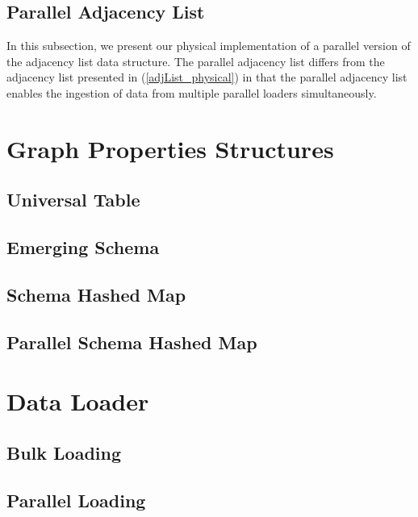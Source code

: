 {\begin{itemize}
\end{itemize}


\subsection{Parallel Adjacency List}

In this subsection, we present our physical implementation of a parallel version of the adjacency list data structure. The parallel adjacency list differs from the adjacency list presented in (\ref{adjList_physical}) in that the parallel adjacency list enables the ingestion of data from multiple parallel loaders simultaneously.



\section{Graph Properties Structures}
\label{GraphPropertiesImp}


\subsection{Universal Table}


\subsection{Emerging Schema}


\subsection{Schema Hashed Map}


\subsection{Parallel Schema Hashed Map}



\section{Data Loader}
\label{dataLoader}
\subsection{Bulk Loading}
\subsection{Parallel Loading}


}
